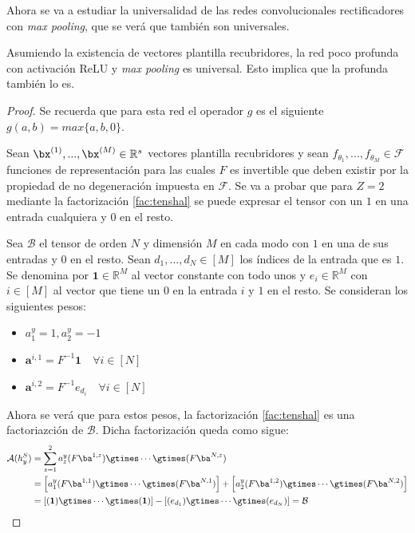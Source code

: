 Ahora se va a estudiar la universalidad de las redes convolucionales rectificadores con \textit{max pooling}, que se verá que también son universales.

\begin{prop}
Asumiendo la existencia de vectores plantilla recubridores, la red poco profunda con activación ReLU y \textit{max pooling} es universal. Esto implica que la profunda también lo es.
\end{prop}
\begin{proof}
Se recuerda que para esta red el operador $g$ es el siguiente $g(a,b)=max\{a,b,0\}$. 

Sean $\bx^{(1)},... ,\bx^{(M)}\in\mathbb{R}^s$ vectores plantilla recubridores y sean $f_{\theta_1},... ,f_{\theta_M}\in\mathcal{F}$ funciones de representación para las cuales $F$ es invertible que deben existir por la propiedad de no degeneración impuesta en $\mathcal{F}$. Se va a probar que para $Z=2$ mediante la factorización \eqref{fac:tenshal} se puede expresar el tensor con un $1$ en una entrada cualquiera y $0$ en el resto. 

Sea $\mathcal{B}$ el tensor de orden $N$ y dimensión $M$ en cada modo con $1$ en una de sus entradas y $0$ en el resto. Sean $d_1,... ,d_N\in[M]$ los índices de la entrada que es $1$. Se denomina por $\mathbf{1}\in\mathbb{R}^M$ al vector constante con todo unos y $e_i\in\mathbb{R}^M$ con $i\in[M]$ al vector que tiene un $0$ en la entrada $i$ y $1$ en el resto. Se consideran los siguientes pesos:
\begin{itemize}
\item $a_1^y = 1, a_2^y = -1$
\item $\mathbf{a}^{i,1} = F^{-1}\mathbf{1} \quad \forall i \in [N]$
\item $\mathbf{a}^{i,2} = F^{-1}e_{d_i} \quad \forall i \in [N]$
\end{itemize}

Ahora se verá que para estos pesos, la factorización \eqref{fac:tenshal} es una factoriazción de $\mathcal{B}$. Dicha factorización queda como sigue:
\begin{align*}
\mathcal{A}(h_y^S)&=\sum_{z=1}^{2}a^y_z(F\ba^{1,z})\gtimes\cdots \gtimes(F\ba^{N,z})\\
&= \left[ a^y_1(F\ba^{1,1})\gtimes\cdots \gtimes(F\ba^{N,1}) \right] + \left[  a^y_2(F\ba^{1,2})\gtimes\cdots \gtimes(F\ba^{N,2}) \right]\\
&= \left[(\mathbf{1})\gtimes\cdots \gtimes(\mathbf{1}) \right] - \left[ (e_{d_1})\gtimes\cdots \gtimes(e_{d_N}) \right] = \mathcal{B}
\end{align*}


\end{proof}
